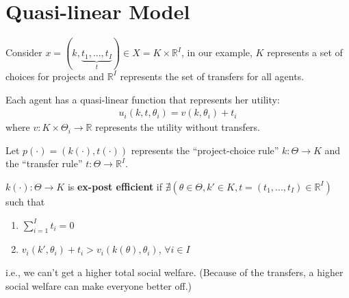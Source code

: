 \documentclass[11pt]{elegantbook}
\begin{document}
\section{Quasi-linear Model}
Consider $x=(k,\underbrace{t_1,...,t_I}_{t})\in X=K\times \mathbb{R}^I$, in our example, $K$ represents a set of choices for projects and $\mathbb{R}^I$ represents the set of transfers for all agents.

Each agent has a quasi-linear function that represents her utility:
\begin{equation}
    \begin{aligned}
        u_i(k,t,\theta_i)=v(k,\theta_i)+t_i
    \end{aligned}
    \nonumber
\end{equation}
where $v: K\times\Theta_i \rightarrow \mathbb{R}$ represents the utility without transfers.

Let $p(\cdot)=\left(k(\cdot),t(\cdot)\right)$ represents the ``project-choice rule'' $k: \Theta \rightarrow K$ and the ``transfer rule'' $t: \Theta \rightarrow \mathbb{R}^I$.
\begin{definition}
    \normalfont
    $k(\cdot):\Theta \rightarrow K$ is \textbf{ex-post efficient} if $\nexists \left(\theta\in\Theta, k'\in K, t=(t_1,...,t_I)\in \mathbb{R}^I\right)$ such that
    \begin{enumerate}[(1).]
        \item $\sum_{i=1}^I t_i=0$
        \item $v_i(k',\theta_i)+t_i> v_i(k(\theta),\theta_i)$, $\forall i\in I$
    \end{enumerate}
    i.e., we can't get a higher total social welfare. (Because of the transfers, a higher social welfare can make everyone better off.)
\end{definition}
\end{document}
